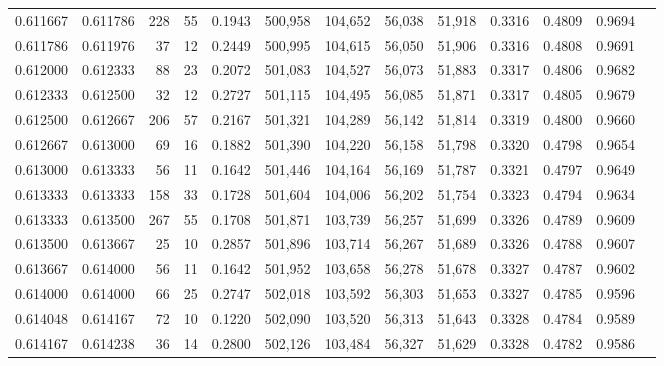 \begin{tabular}{rrrrrrrrrrrrr}
0.611667 & 0.611786 &   228 &  55 &                                     0.1943 & 500,958 & 104,652 &  56,038 &  51,918 & 0.3316 & 0.4809 & 0.9694 \\
0.611786 & 0.611976 &    37 &  12 &                                     0.2449 & 500,995 & 104,615 &  56,050 &  51,906 & 0.3316 & 0.4808 & 0.9691 \\
0.612000 & 0.612333 &    88 &  23 &                                     0.2072 & 501,083 & 104,527 &  56,073 &  51,883 & 0.3317 & 0.4806 & 0.9682 \\
0.612333 & 0.612500 &    32 &  12 &                                     0.2727 & 501,115 & 104,495 &  56,085 &  51,871 & 0.3317 & 0.4805 & 0.9679 \\
0.612500 & 0.612667 &   206 &  57 &                                     0.2167 & 501,321 & 104,289 &  56,142 &  51,814 & 0.3319 & 0.4800 & 0.9660 \\
0.612667 & 0.613000 &    69 &  16 &                                     0.1882 & 501,390 & 104,220 &  56,158 &  51,798 & 0.3320 & 0.4798 & 0.9654 \\
0.613000 & 0.613333 &    56 &  11 &                                     0.1642 & 501,446 & 104,164 &  56,169 &  51,787 & 0.3321 & 0.4797 & 0.9649 \\
0.613333 & 0.613333 &   158 &  33 &                                     0.1728 & 501,604 & 104,006 &  56,202 &  51,754 & 0.3323 & 0.4794 & 0.9634 \\
0.613333 & 0.613500 &   267 &  55 &                                     0.1708 & 501,871 & 103,739 &  56,257 &  51,699 & 0.3326 & 0.4789 & 0.9609 \\
0.613500 & 0.613667 &    25 &  10 &                                     0.2857 & 501,896 & 103,714 &  56,267 &  51,689 & 0.3326 & 0.4788 & 0.9607 \\
0.613667 & 0.614000 &    56 &  11 &                                     0.1642 & 501,952 & 103,658 &  56,278 &  51,678 & 0.3327 & 0.4787 & 0.9602 \\
0.614000 & 0.614000 &    66 &  25 &                                     0.2747 & 502,018 & 103,592 &  56,303 &  51,653 & 0.3327 & 0.4785 & 0.9596 \\
0.614048 & 0.614167 &    72 &  10 &                                     0.1220 & 502,090 & 103,520 &  56,313 &  51,643 & 0.3328 & 0.4784 & 0.9589 \\
0.614167 & 0.614238 &    36 &  14 &                                     0.2800 & 502,126 & 103,484 &  56,327 &  51,629 & 0.3328 & 0.4782 & 0.9586 \\

\end{tabular}
